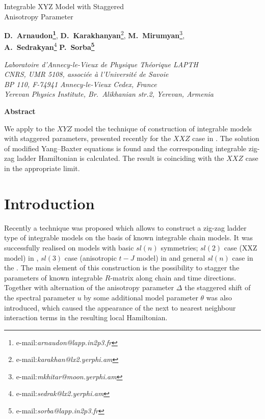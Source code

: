 \documentclass[a4paper,11pt]{article}
\begin{document}
\begin{center} 
{\LARGE \textsf{
Integrable XYZ Model with Staggered 
\\[4mm]
Anisotropy Parameter}} 

\vspace{36pt}
{\large
{\bf D.~Arnaudon\footnote{e-mail:{\sl arnaudon@lapp.in2p3.fr}}},
{\bf D.~Karakhanyan}\footnote{e-mail:{\sl karakhan@lx2.yerphi.am}},
{\bf M.~Mirumyan}\footnote{e-mail:{\sl mkhitar@moon.yerphi.am}},\\

{\bf A.~Sedrakyan}\footnote{e-mail:{\sl sedrak@lx2.yerphi.am}}
{\bf P.~Sorba\footnote{e-mail:{\sl sorba@lapp.in2p3.fr}}}\\ 
}

\vspace{30pt}

\emph{Laboratoire d'Annecy-le-Vieux de Physique Th\'eorique LAPTH}
\\
\emph{CNRS, UMR 5108, associ\'ee {\`a} l'Universit\'e de Savoie}
\\
\emph{BP 110, F-74941 Annecy-le-Vieux Cedex, France}
\\
\emph{Yerevan Physics Institute, Br.~Alikhanian str.2, Yerevan, Armenia}
\vspace{36pt}

\vfill
{\bf Abstract}
\end{center}

We apply to the $XYZ$ model the technique of construction of integrable 
models with staggered parameters, presented recently for the $XXZ$ case
in \cite{APSS}. The solution of modified
Yang--Baxter equations is found and the corresponding integrable  
zig-zag ladder Hamiltonian is calculated. The result is coinciding
with the $XXZ$ case in the appropriate limit.

\vfill
{}

\newpage
\pagestyle{plain}


\section{Introduction}
\setcounter{equation}{0}
\indent

Recently a technique was proposed \cite{APSS} which allows 
to construct a zig-zag ladder type of integrable models on the basis
of known integrable chain models. It was successfully
realised on models with basic $sl(n)$ symmetries; $sl(2)$ case
(XXZ model) in \cite{APSS}, $sl(3)$ case (anisotropic $t-J$ model)
in \cite{TS} and general $sl(n)$ case in the  \cite{ASSS}.
The main element of this construction is the possibility to stagger
the parameters of known integrable $R$-matrix along chain and time
directions. Together with alternation of the anisotropy parameter
$\Delta$ \cite{APSS, TS} the staggered shift of the spectral
parameter $u$ by some additional model parameter $\theta$ was
also introduced, which caused the appearance of the next to nearest
neighbour interaction terms in the resulting local Hamiltonian.
\end{document}

